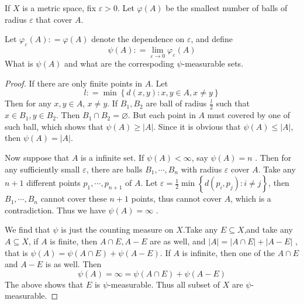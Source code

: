 \documentclass[../main.tex]{subfiles}
\begin{document}
\begin{exercise}{}{}
     If \(  X  \) is a metric space, fix \(   \varepsilon > 0  \). Let \(   \varphi \left( A \right)   \) be the smallest number of balls of radius \(   \varepsilon   \) that cover \(  A  \).      

Let \(   \varphi _{ \varepsilon }\left( A \right): =  \varphi \left( A \right)    \) denote the dependence on \(   \varepsilon   \), and define \[
\psi \left( A \right) : = \lim_{ \varepsilon \to 0 }  \varphi _{ \varepsilon }\left( A \right)  
\] What is \(  \psi \left( A \right)   \)  and what are the correspoding \(  \psi   \)-measurable sets. 
\end{exercise}
\begin{proof}
    If there are only finite points in \(  A  \). Let \[
    l : =  \min \left\{ d\left( x,y \right) :x,y \in A ,x \neq y\right\}
    \] Then for any \(  x,y \in A  \), \(  x \neq y  \). If \(  B_1,B_2  \) are ball of radius \( \frac{l }{2 }   \) such that \(  x\in B_1, y \in B_2  \).     Then \(  B_1\cap B_2= \varnothing  \).  But each point in \(  A  \) must covered by one of such ball, which shows that \(  \psi \left( A \right)\ge  \left| A \right|    \).    Since it is obvious that \(  \psi \left( A \right)\le \left| A \right|    \),  then \(  \psi \left( A \right)= \left| A \right|    \). 
    
    Now suppose that \(  A  \) is a infinite set. If \(  \psi \left( A \right)< \infty   \), say \(  \psi \left( A \right)= n   \) . Then for any sufficiently small \(   \varepsilon   \), there are balls \(  B_1,\cdots ,B_{n}  \)  with radius \(   \varepsilon   \) cover \(  A  \). Take any \(  n+ 1  \) different points \(  p_1,\cdots ,p_{n+ 1}  \)  of \(  A  \). Let  \(   \varepsilon = \frac{1}{2} \min \left\{ d\left( p_{i},p_{j} \right): i\neq j  \right\}  \), then \(   B_1,\cdots,B_n   \) cannot cover these \(  n+ 1  \) points, thus cannot cover  \(  A  \), which is a contradiction. Thus we have \(  \psi \left( A \right)= \infty   \) . 

    We find that \(  \psi   \) is just the counting measure on \(  X  \).Take any \(  E\subseteq X  \),and take any \(  A\subseteq X  \), if \(  A  \) is finite, then \(  A\cap E, A- E  \) are as well, and \(  \left| A \right|= \left| A\cap E \right|+ \left| A-E \right|     \)   , that is \(  \psi \left( A \right)= \psi \left( A\cap E \right)+ \psi \left( A-E \right)     \).  If \(  A  \) is infinite, then one of the \(  A\cap E  \)   and \(  A-E  \) is as well. Then \[
    \psi \left( A \right)= \infty= \psi \left( A\cap E \right)+ \psi \left( A-E \right)   
    \]The above shows that \(  E  \) is \(  \psi   \)-measurable. Thus all subset of \(  X  \) are \(  \psi   \)-measurable.        
\end{proof}
\end{document}
